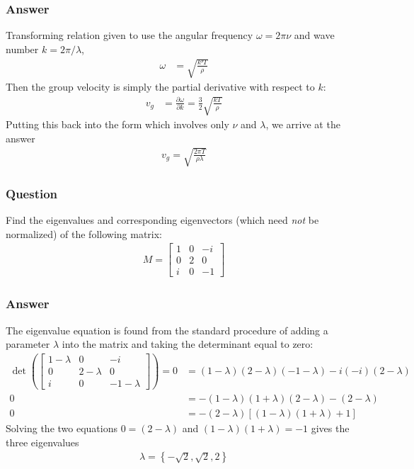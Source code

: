 \subsubsection{Answer}

Transforming relation given to use the angular frequency $ω = 2πν$ and
wave number $k = 2π/λ$,
\begin{align*}
    ω &= \sqrt{ \frac{k³T}{ρ} }
\end{align*}
Then the group velocity is simply the partial derivative with respect to $k$:
\begin{align*}
    v_g &= \frac{∂ω}{∂k} = \frac 32 \sqrt{\frac{kT}{ρ}}
\end{align*}
Putting this back into the form which involves only $ν$ and $λ$, we arrive at
the answer
\begin{align}
    \boxed{ v_g = \sqrt{\frac{2πT}{ρλ}} }
\end{align}

\subsubsection{Question}

Find the eigenvalues and corresponding eigenvectors (which need \emph{not} be
normalized) of the following matrix:
\begin{align*}
    M = \begin{bmatrix}
	1 & 0 & -i \\
	0 & 2 & 0 \\
	i & 0 & -1
    \end{bmatrix}
\end{align*}

\subsubsection{Answer}

The eigenvalue equation is found from the standard procedure of adding a
parameter $λ$ into the matrix and taking the determinant equal to zero:
\begin{align*}
    \det ( \begin{bmatrix}
	1-λ & 0   & -i   \\
	0   & 2-λ & 0    \\
	i   & 0   & -1-λ
    \end{bmatrix} ) = 0 &= (1-λ)(2-λ)(-1-λ) - i(-i)(2-λ) \\
    0 &= -(1-λ)(1+λ)(2-λ) - (2-λ) \\
    0 &= -(2-λ)\left[ (1-λ)(1+λ) + 1 \right]
\end{align*}
Solving the two equations $0 = (2 - λ)$ and $(1-λ)(1+λ) = -1$ gives the three
eigenvalues
\begin{align}
    \boxed{
    λ = \left\{ -\sqrt 2, \sqrt 2, 2 \right\}
    }
\end{align}

